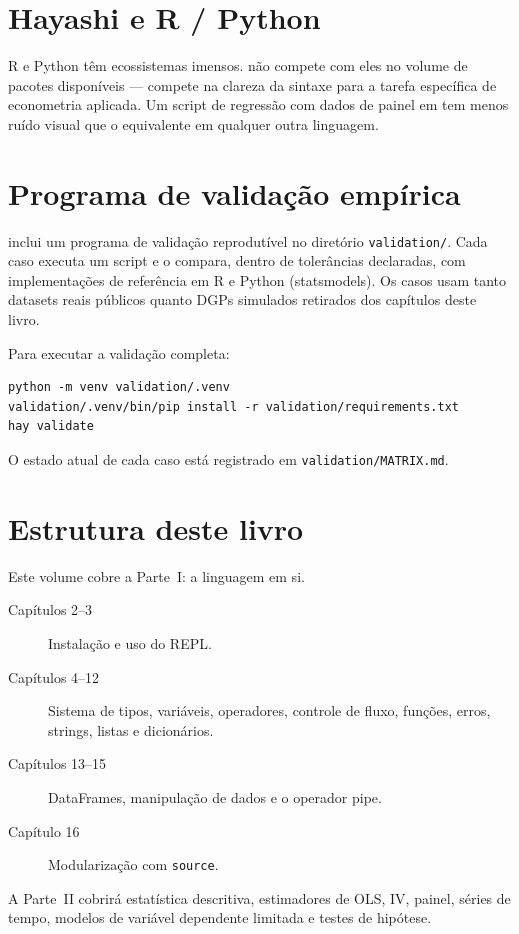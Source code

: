 \section{Hayashi e R / Python}

R e Python têm ecossistemas imensos. \hayashi{} não compete com eles no volume de
pacotes disponíveis — compete na clareza da sintaxe para a tarefa específica de
econometria aplicada. Um script de regressão com dados de painel em \hayashi{} tem
menos ruído visual que o equivalente em qualquer outra linguagem.

\section{Programa de validação empírica}

\hayashi{} inclui um programa de validação reprodutível no diretório
\texttt{validation/}. Cada caso executa um script \hayashi{} e o compara,
 dentro de tolerâncias declaradas, com implementações de referência em R e
Python (statsmodels). Os casos usam tanto datasets reais públicos quanto DGPs
simulados retirados dos capítulos deste livro.

Para executar a validação completa:

\begin{lstlisting}[caption={Executar o programa de validação}]
python -m venv validation/.venv
validation/.venv/bin/pip install -r validation/requirements.txt
hay validate
\end{lstlisting}

O estado atual de cada caso está registrado em \texttt{validation/MATRIX.md}.

\section{Estrutura deste livro}

Este volume cobre a Parte~I: a linguagem em si.

\begin{description}
  \item[Capítulos 2--3] Instalação e uso do REPL.
  \item[Capítulos 4--12] Sistema de tipos, variáveis, operadores, controle de fluxo,
        funções, erros, strings, listas e dicionários.
  \item[Capítulos 13--15] DataFrames, manipulação de dados e o operador pipe.
  \item[Capítulo 16] Modularização com \lstinline{source}.
\end{description}

A Parte~II cobrirá estatística descritiva, estimadores de OLS, IV, painel, séries de
tempo, modelos de variável dependente limitada e testes de hipótese.
